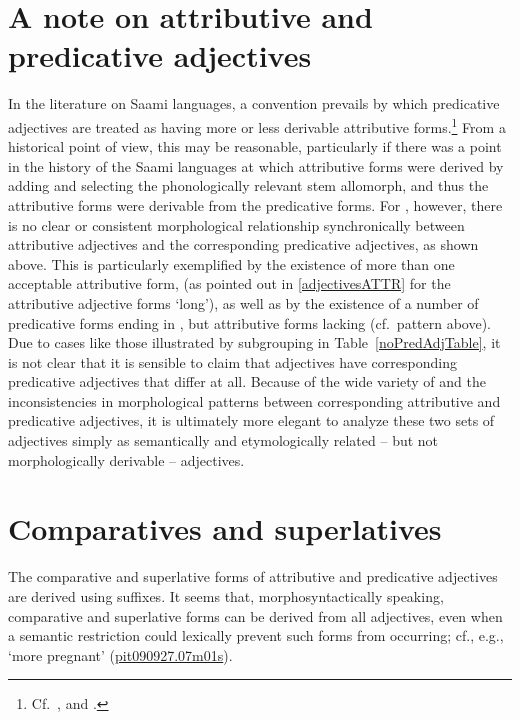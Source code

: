 \section{A note on attributive and predicative adjectives}\label{notePredNounsAdjs}
In the literature on Saami languages, a convention prevails by which predicative adjectives are treated as having more or less derivable attributive forms.\footnote{Cf.~\citet[71]{Sammallahti1998}, \citet[74-76;98]{Svonni2009} and \citet[179]{Feist2010}.} 
From a historical point of view, this may be reasonable, particularly if there was a point in the history of the Saami languages at which attributive forms were derived by adding \mbox{} and selecting the phonologically relevant stem allomorph, and thus the attributive forms were derivable from the predicative forms. For \PS, however, there is no clear or consistent morphological relationship synchronically between attributive adjectives and the corresponding predicative adjectives, as shown above. This is particularly exemplified by the existence of more than one acceptable attributive form, (as pointed out in \SEC\ref{adjectivesATTR} for the attributive adjective forms \TILDE{} ‘long’), as well as by the existence of a number of predicative forms ending in , but attributive forms lacking  (cf.~pattern  above). 
Due to cases like those illustrated by subgrouping  in Table~\ref{noPredAdjTable}, it is not clear that it is sensible to claim that  adjectives have corresponding predicative adjectives that differ at all. 
Because of the wide variety of and the inconsistencies in morphological patterns between corresponding attributive and predicative adjectives, it is ultimately more elegant to analyze these two sets of adjectives simply as semantically and etymologically related – but not morphologically derivable – adjectives. 


\section{Comparatives and superlatives}\label{compSuperlADJs}
The comparative and superlative %
forms of attributive and predicative adjectives are derived using suffixes. It seems that, morphosyntactically speaking, comparative and superlative forms can be derived from all adjectives, even when a semantic restriction could lexically prevent such forms from occurring; cf., e.g.,~ ‘more pregnant’ (\hyperlink{pit090927}{pit090927.07m01s}). 

